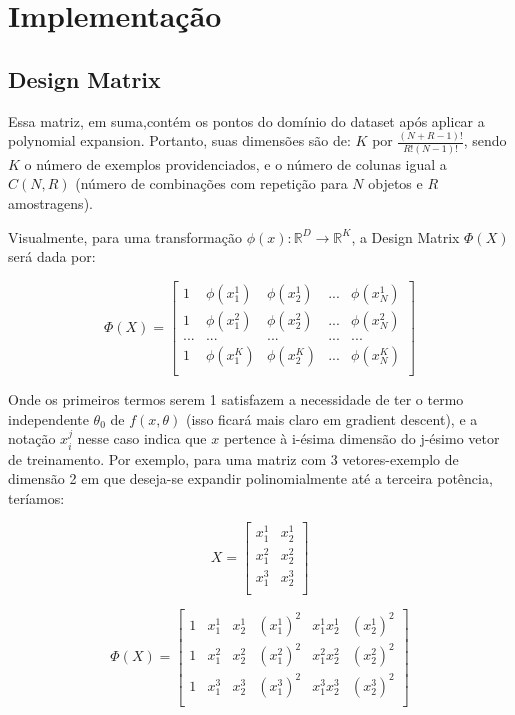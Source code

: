 \documentclass{article}
\begin{document}
\section{Implementação}

\subsection{Design Matrix}

Essa matriz, em suma,contém os 
pontos do domínio do dataset após aplicar a polynomial
expansion. Portanto, suas dimensões são de:
$K$ por $\frac{(N+R-1)!}{R!(N-1)!}$, sendo $K$ o número de 
exemplos providenciados, e o número de colunas igual a
$C(N,R)$ (número de combinações com repetição para $N$
objetos e $R$ amostragens).

Visualmente, para uma transformação $\phi(x): \mathbb{R}^{D} 
\rightarrow \mathbb{R}^{K}$, a Design Matrix $\Phi(X)$ será
dada por:

$$
\Phi(X) = 
\begin{bmatrix}
    1 & \phi(x_{1}^{1}) & \phi(x_{2}^{1}) & ... & \phi(x_{N}^{1}) \\
    1 & \phi(x_{1}^{2}) & \phi(x_{2}^{2}) & ... & \phi(x_{N}^{2}) \\
    ... & ... & ... & ... & ... \\
    1 & \phi(x_{1}^{K}) & \phi(x_{2}^{K}) & ... & \phi(x_{N}^{K}) \\
\end{bmatrix}
$$

Onde os primeiros termos serem 1 satisfazem a necessidade de 
ter o termo independente $\theta_{0}$ de $f(x, \theta)$
(isso ficará mais claro em gradient descent), e 
a notação $x_{i}^{j}$ nesse caso indica que $x$ pertence à 
i-ésima dimensão do j-ésimo vetor de treinamento. Por exemplo,
para uma matriz com  3 vetores-exemplo de dimensão 2 em que 
deseja-se expandir polinomialmente até a terceira potência, 
teríamos:

$$
X = 
\begin{bmatrix}
    x_{1}^{1} & x_{2}^{1} \\
    x_{1}^{2} & x_{2}^{2} \\
    x_{1}^{3} & x_{2}^{3} \\
\end{bmatrix}
$$

$$
\Phi(X) = 
\begin{bmatrix}
    1 & x_{1}^{1} & x_{2}^{1} & (x_{1}^{1})^{2} & x_{1}^{1}x_{2}^{1} & (x_{2}^{1})^{2} \\
    1 & x_{1}^{2} & x_{2}^{2} & (x_{1}^{2})^{2} & x_{1}^{2}x_{2}^{2} & (x_{2}^{2})^{2}\\
    1 & x_{1}^{3} & x_{2}^{3} & (x_{1}^{3})^{2} & x_{1}^{3}x_{2}^{3} & (x_{2}^{3})^{2}\\
\end{bmatrix}
$$
\end{document}
